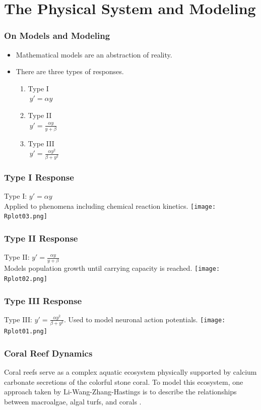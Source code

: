 
\section{The Physical System and Modeling}
\begin{frame}\frametitle{On Models and Modeling}
  \begin{itemize}
	\item Mathematical models are an abstraction of reality.
	\item There are three types of responses. 
	\begin{enumerate}
		\item Type I\\
		$\ y'=\alpha y$
		\item Type II\\
		$\ y' = \frac{\alpha y}{y+ \beta}$ 
		\item Type III\\
		$\ y'= \frac {\alpha y^2}{\beta + y^2}$
	\end{enumerate}
  \end{itemize}
\end{frame}

\begin{frame}
  \frametitle{Type I Response}
   Type I: $y'=\alpha y$\\ Applied to phenomena including chemical reaction kinetics.
   \texttt{[image: Rplot03.png]}
\end{frame}

\begin{frame}
  \frametitle{Type II Response} 
    Type II: $y'=\frac{\alpha y}{y+\beta}$\\Models population growth until carrying capacity is reached.
   \texttt{[image: Rplot02.png]}
\end{frame}

\begin{frame}
  \frametitle{Type III Response}
    Type III: $y'=\frac{\alpha y^2}{\beta+y^2}$. Used to model neuronal action potentials.
    \texttt{[image: Rplot01.png]}
\end{frame}

\begin{frame}
\frametitle{Coral Reef Dynamics}
\hspace{1.5em}Coral reefs serve as a complex aquatic ecosystem physically supported by calcium carbonate secretions of the colorful stone coral. To model this ecosystem, one approach taken by Li-Wang-Zhang-Hastings is to describe the relationships between macroalgae, algal turfs, and corals \cite{Hastings}.
\end{frame}


